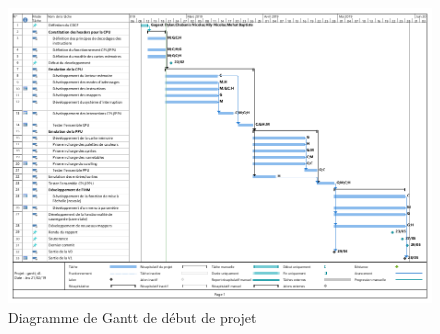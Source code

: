 \begin{figure}[h]
  \centering
   \includegraphics[scale=0.45]{GanttV1.png}
   \caption{Diagramme de Gantt de début de projet}
\end{figure}
